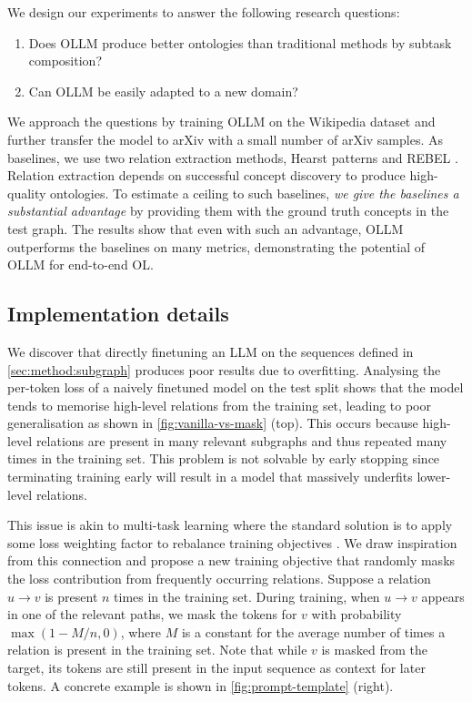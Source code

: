 \documentclass{article}
\newcommand{\name}{{OLLM}\xspace}
\begin{document}
We design our experiments to answer the following research questions:
\begin{enumerate}
    \item Does \name produce better ontologies than traditional methods by subtask composition?
    \item Can \name be easily adapted to a new domain?
\end{enumerate}
 We approach the questions by training \name on the Wikipedia dataset and further transfer the model to arXiv with a small number of arXiv samples. As baselines, we use two relation extraction methods, Hearst patterns \cite{hearst1998automated,roller2018hearst} and REBEL \cite{cabot2021rebel}. Relation extraction depends on successful concept discovery to produce high-quality ontologies. To estimate a ceiling to such baselines, \emph{we give the baselines a substantial advantage} by providing them with the ground truth concepts in the test graph. The results show that even with such an advantage, \name outperforms the baselines on many metrics, demonstrating the potential of \name for end-to-end OL.

\subsection{Implementation details}  \label{sec:implementation}





We discover that directly finetuning an LLM on the sequences defined in \cref{sec:method:subgraph} produces poor results due to overfitting. Analysing the per-token loss of a naively finetuned model on the test split shows that the model tends to memorise high-level relations from the training set, leading to poor generalisation as shown in \cref{fig:vanilla-vs-mask} (top). This occurs because high-level relations are present in many relevant subgraphs and thus repeated many times in the training set. This problem is not solvable by early stopping since terminating training early will result in a model that massively underfits lower-level relations. 

This issue is akin to multi-task learning \cite{caruana1997multitask} where the standard solution is to apply some loss weighting factor to rebalance training objectives \cite{sermanet2013overfeat,kendall2018multi}. We draw inspiration from this connection and propose a new training objective that randomly masks the loss contribution from frequently occurring relations. Suppose a relation $u \to v$ is present $n$ times in the training set. During training, when $u \to v$ appears in one of the relevant paths, we mask the tokens for $v$ with probability $\max(1 - M/n, 0)$, where $M$ is a constant for the average number of times a relation is present in the training set. Note that while $v$ is masked from the target, its tokens are still present in the input sequence as context for later tokens. A concrete example is shown in \cref{fig:prompt-template} (right). 
\end{document}
